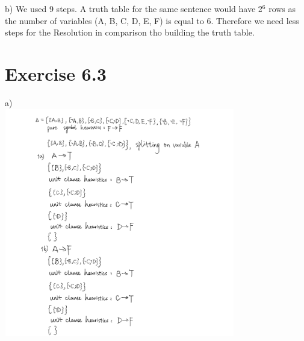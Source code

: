 \documentclass[12pt]{article}
\begin{document}
b) We used 9 steps. A truth table for the same sentence would have 2$^6$ rows as the number of variables (A, B, C, D, E, F) is equal to 6. Therefore we need less steps for the Resolution in comparison tho building the truth table.\\


\section*{Exercise 6.3}
a)\\
\includegraphics[height=100mm]{figures/6.3}\\
\end{document}
